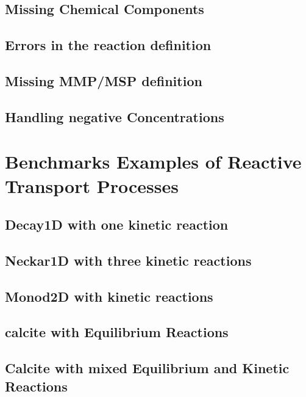 \subsection{Missing Chemical Components}

\subsection{Errors in the reaction definition}

\subsection{Missing MMP/MSP definition}

\subsection{Handling negative Concentrations}



\section{Benchmarks Examples of Reactive Transport Processes}
\label{sec:benchmarks}
\subsection{Decay1D with one kinetic reaction}

\subsection{Neckar1D with three kinetic reactions}

\subsection{Monod2D with kinetic reactions}

\subsection{calcite with Equilibrium Reactions}

\subsection{Calcite with mixed Equilibrium and Kinetic Reactions}